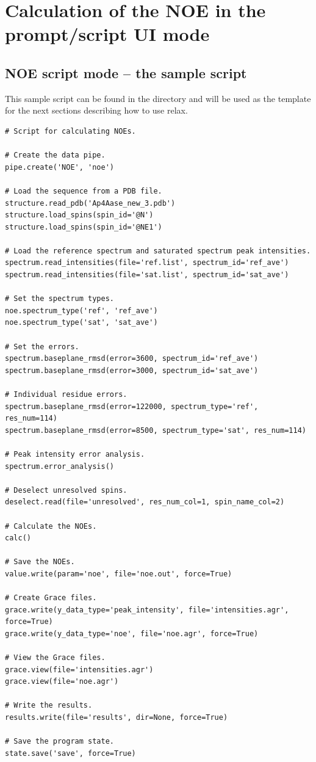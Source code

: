 
\section{Calculation of the NOE in the prompt/script UI mode}



\subsection{NOE script mode -- the sample script}

This sample script can be found in the  directory and will be used as the template for the next sections describing how to use relax.

\begin{lstlisting}
# Script for calculating NOEs.

# Create the data pipe.
pipe.create('NOE', 'noe')

# Load the sequence from a PDB file.
structure.read_pdb('Ap4Aase_new_3.pdb')
structure.load_spins(spin_id='@N')
structure.load_spins(spin_id='@NE1')

# Load the reference spectrum and saturated spectrum peak intensities.
spectrum.read_intensities(file='ref.list', spectrum_id='ref_ave')
spectrum.read_intensities(file='sat.list', spectrum_id='sat_ave')

# Set the spectrum types.
noe.spectrum_type('ref', 'ref_ave')
noe.spectrum_type('sat', 'sat_ave')

# Set the errors.
spectrum.baseplane_rmsd(error=3600, spectrum_id='ref_ave')
spectrum.baseplane_rmsd(error=3000, spectrum_id='sat_ave')

# Individual residue errors.
spectrum.baseplane_rmsd(error=122000, spectrum_type='ref', res_num=114)
spectrum.baseplane_rmsd(error=8500, spectrum_type='sat', res_num=114)

# Peak intensity error analysis.
spectrum.error_analysis()

# Deselect unresolved spins.
deselect.read(file='unresolved', res_num_col=1, spin_name_col=2)

# Calculate the NOEs.
calc()

# Save the NOEs.
value.write(param='noe', file='noe.out', force=True)

# Create Grace files.
grace.write(y_data_type='peak_intensity', file='intensities.agr', force=True)
grace.write(y_data_type='noe', file='noe.agr', force=True)

# View the Grace files.
grace.view(file='intensities.agr')
grace.view(file='noe.agr')

# Write the results.
results.write(file='results', dir=None, force=True)

# Save the program state.
state.save('save', force=True)
\end{lstlisting}



